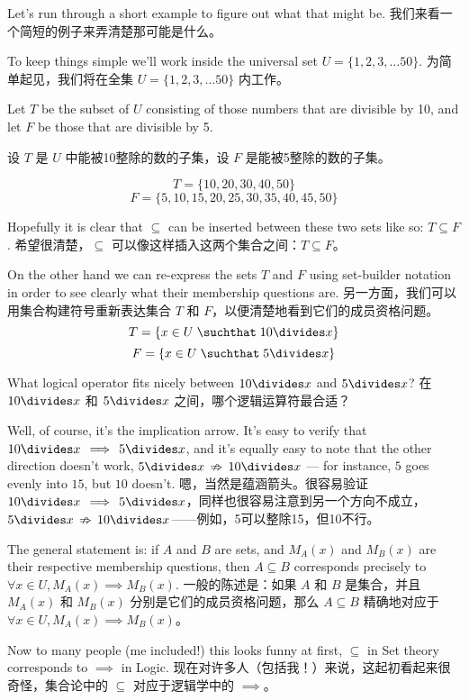 Let's run through a short example to figure out what that
might be.
我们来看一个简短的例子来弄清楚那可能是什么。

To keep things
simple we'll work inside the universal set $U=\{ 1, 2, 3, \ldots 50 \}$.
为简单起见，我们将在全集 $U=\{ 1, 2, 3, \ldots 50 \}$ 内工作。

Let $T$ be the subset of $U$ consisting of those numbers that are 
divisible by 10, and let $F$ be those that are divisible by 5.

设 $T$ 是 $U$ 中能被10整除的数的子集，设 $F$ 是能被5整除的数的子集。

\[ T = \{10, 20, 30, 40, 50 \} \]
\[ F = \{5, 10, 15, 20, 25, 30, 35, 40, 45, 50 \} \]

Hopefully it is clear that $\subseteq$ can be inserted between these two sets
like so: $T \subseteq F$.
希望很清楚，$\subseteq$ 可以像这样插入这两个集合之间：$T \subseteq F$。

On the other hand we can re-express the sets $T$ and $F$ using set-builder
notation in order to see clearly what their membership questions are.
另一方面，我们可以用集合构建符号重新表达集合 $T$ 和 $F$，以便清楚地看到它们的成员资格问题。
\[ T = \{ x \in U \; \suchthat \; 10\divides x \} \]
\[ F = \{ x \in U \; \suchthat \; 5\divides x \} \]

What logical operator fits nicely between $10\divides x$ and $5\divides x$?
在 $10\divides x$ 和 $5\divides x$ 之间，哪个逻辑运算符最合适？

Well, of course, it's the implication arrow.  It's easy to
verify that $10\divides x \, \implies \, 5\divides x$, and it's equally easy
to note that the other direction doesn't work, $5\divides x \, \nRightarrow \, 10\divides x$ --- for instance, $5$ goes evenly into $15$, but $10$ doesn't.
嗯，当然是蕴涵箭头。很容易验证 $10\divides x \, \implies \, 5\divides x$，同样也很容易注意到另一个方向不成立，$5\divides x \, \nRightarrow \, 10\divides x$——例如，5可以整除15，但10不行。

The general statement is: if $A$ and $B$ are sets, and $M_A(x)$ and $M_B(x)$ 
are their respective membership questions, then $A \subseteq B$ corresponds
precisely to $\forall x \in U, M_A(x) \implies M_B(x)$.
一般的陈述是：如果 $A$ 和 $B$ 是集合，并且 $M_A(x)$ 和 $M_B(x)$ 分别是它们的成员资格问题，那么 $A \subseteq B$ 精确地对应于 $\forall x \in U, M_A(x) \implies M_B(x)$。

Now to many people (me included!) this looks funny at first, $\subseteq$
in Set theory corresponds to $\implies$ in Logic.
现在对许多人（包括我！）来说，这起初看起来很奇怪，集合论中的 $\subseteq$ 对应于逻辑学中的 $\implies$。

